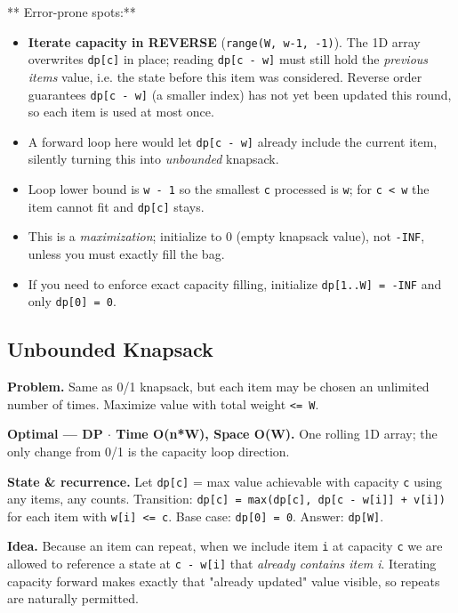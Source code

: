 \documentclass[11pt]{article}
\providecommand{\tightlist}{\setlength{\itemsep}{1pt}\setlength{\parskip}{0pt}}
\begin{document}
** Error-prone spots:**

\begin{itemize}
\tightlist
\item
  \textbf{Iterate capacity in REVERSE} (\texttt{range(W,\ w-1,\ -1)}). The 1D array overwrites \texttt{dp{[}c{]}} in place; reading \texttt{dp{[}c\ -\ w{]}} must still hold the \emph{previous item\textquotesingle s} value, i.e. the state before this item was considered. Reverse order guarantees \texttt{dp{[}c\ -\ w{]}} (a smaller index) has not yet been updated this round, so each item is used at most once.
\item
  A forward loop here would let \texttt{dp{[}c\ -\ w{]}} already include the current item, silently turning this into \emph{unbounded} knapsack.
\item
  Loop lower bound is \texttt{w\ -\ 1} so the smallest \texttt{c} processed is \texttt{w}; for \texttt{c\ \textless{}\ w} the item cannot fit and \texttt{dp{[}c{]}} stays.
\item
  This is a \emph{maximization}; initialize to 0 (empty knapsack value), not \texttt{-INF}, unless you must exactly fill the bag.
\item
  If you need to enforce exact capacity filling, initialize \texttt{dp{[}1..W{]}\ =\ -INF} and only \texttt{dp{[}0{]}\ =\ 0}.
\end{itemize}

\subsection{Unbounded Knapsack}\label{unbounded-knapsack}

\textbf{Problem.} Same as 0/1 knapsack, but each item may be chosen an unlimited number of times. Maximize value with total weight \texttt{\textless{}=\ W}.

\textbf{Optimal --- DP \(\cdot\) Time O(n*W), Space O(W).} One rolling 1D array; the only change from 0/1 is the capacity loop direction.

\textbf{State \& recurrence.} Let \texttt{dp{[}c{]}} = max value achievable with capacity \texttt{c} using any items, any counts. Transition: \texttt{dp{[}c{]}\ =\ max(dp{[}c{]},\ dp{[}c\ -\ w{[}i{]}{]}\ +\ v{[}i{]})} for each item with \texttt{w{[}i{]}\ \textless{}=\ c}. Base case: \texttt{dp{[}0{]}\ =\ 0}. Answer: \texttt{dp{[}W{]}}.

\textbf{Idea.} Because an item can repeat, when we include item \texttt{i} at capacity \texttt{c} we are allowed to reference a state at \texttt{c\ -\ w{[}i{]}} that \emph{already contains item i}. Iterating capacity forward makes exactly that "already updated" value visible, so repeats are naturally permitted.
\end{document}
